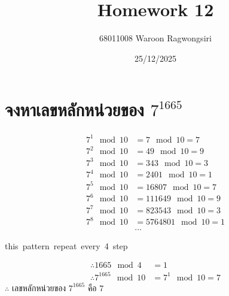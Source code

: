 \documentclass{article}
\title{Homework 12}
\author{68011008 Waroon Ragwongsiri}
\date{25/12/2025}
\begin{document}
\maketitle

{\small
\section{จงหาเลขหลักหน่วยของ $7^{1665}$}
}
\begin{align}
	7^{1} \mod 10 &= 7 \mod 10 = 7 \\
	7^{2} \mod 10 &= 49 \mod 10 = 9 \\
	7^{3} \mod 10 &= 343 \mod 10 = 3 \\
	7^{4} \mod 10 &= 2401 \mod 10 = 1 \\
	7^{5} \mod 10 &= 16807 \mod 10 = 7 \\
	7^{6} \mod 10 &= 111649 \mod 10 = 9 \\
	7^{7} \mod 10 &= 823543 \mod 10 = 3 \\
	7^{8} \mod 10 &= 5764801 \mod 10 = 1 \\
	&...
\end{align}
\begin{center}
	this\ pattern\ repeat\ every\ 4\ step \\
\end{center}
\begin{align}
	\therefore 1665 \mod 4 &= 1 \\
	\therefore 7^{1665} \mod 10 &= 7^{1} \mod 10 = 7
\end{align}
\subitem
$\therefore$ เลขหลักหน่วยของ $7^{1665}$ คือ $7$
\end{document}
